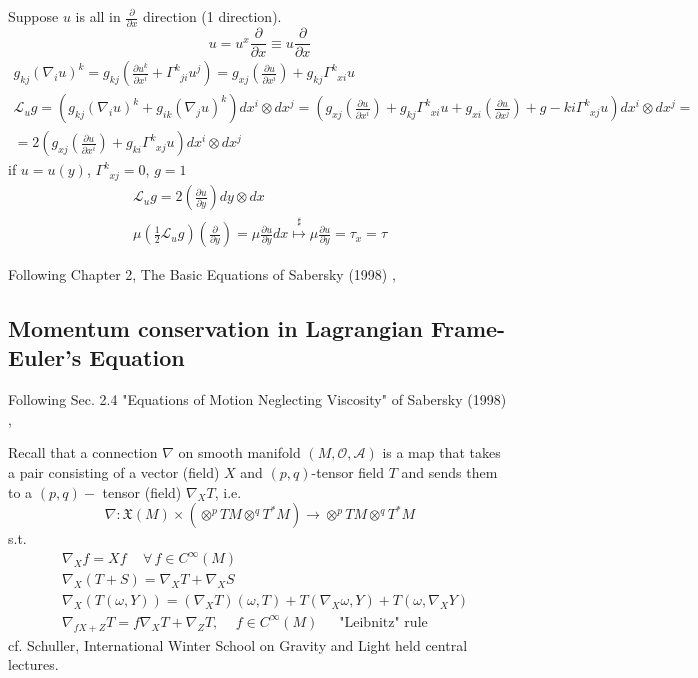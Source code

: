 \documentclass[twoside,landscape,10pt]{amsart}
\theoremstyle{plain}
\theoremstyle{definition}
\theoremstyle{remark}
\theoremstyle{remark}
\begin{document}
\begin{multicols*}{2}
Suppose $u$ is all in $\frac{ \partial }{ \partial x}$ direction (1 direction).  
\[
u = u^x \frac{ \partial }{ \partial x} \equiv u \frac{ \partial }{ \partial x}
\]
\[
\begin{gathered}
  g_{kj} (\nabla_i u)^k = g_{kj} \left( \frac{ \partial u^k}{ \partial x^i} + \Gamma^k_{ \; \; ji} u^j \right) = g_{xj} \left( \frac{ \partial u}{ \partial x^i} \right) + g_{kj} \Gamma^k_{ \; \; xi } u \\
  \mathcal{L}_u g = (g_{kj} (\nabla_i u)^k + g_{ik} (\nabla_j u)^k ) dx^i \otimes dx^j = (g_{xj} \left( \frac{ \partial u}{ \partial x^i} \right) + g_{kj} \Gamma^k_{ \; \; xi} u + g_{xi} \left( \frac{ \partial u }{ \partial x^j} \right) + g-{ki} \Gamma^k_{ \; \; xj} u ) dx^i \otimes dx^j = \\
  = 2 \left( g_{xj} \left( \frac{ \partial u}{ \partial x^i} \right)+ g_{ki} \Gamma^k_{ \; \; xj} u \right) dx^i \otimes dx^j
\end{gathered}
\]
if $u=u(y)$, $\Gamma^k_{ \; \; xj} = 0$, $g=1$
\[
\begin{gathered}
  \mathcal{L}_u g = 2 \left( \frac{ \partial u }{ \partial y} \right) dy \otimes dx \\ 
  \mu\left( \frac{1}{2} \mathcal{L}_u g \right) \left( \frac{ \partial }{ \partial y} \right) = \mu \frac{ \partial u}{ \partial y } dx \overset{\sharp}{\mapsto } \mu \frac{ \partial u}{ \partial y} = \tau_x = \tau
\end{gathered}
\]

Following Chapter 2, The Basic Equations of Sabersky (1998) \cite{SAHG1998},

\subsection{Momentum conservation in Lagrangian Frame-Euler's Equation}

Following Sec. 2.4 "Equations of Motion Neglecting Viscosity" of Sabersky (1998) \cite{SAHG1998},

Recall that a connection $\nabla$ on smooth manifold $(M, \mathcal{O}, \mathcal{A})$ is a map that takes a pair consisting of a vector (field) $X$ and $(p,q)$-tensor field $T$ and sends them to a $(p,q)-$ tensor (field) $\nabla_XT$, i.e. 
\[
\nabla : \mathfrak{X}(M) \times (\otimes^p TM \otimes^q T^*M) \to \otimes^p TM \otimes^q T^*M
\]
s.t. 
\[
\begin{aligned}
& \nabla_X f = Xf \quad \, \forall \, f \in C^{\infty}(M) \\ 
& \nabla_X(T + S) = \nabla_X T + \nabla_X S \\ 
& \nabla_X(T(\omega, Y)) = (\nabla_X T)(\omega, T) + T(\nabla_X \omega, Y) + T(\omega, \nabla_X Y) \\
& \nabla_{fX + Z} T = f\nabla_X T + \nabla_Z T , \quad \, f \in C^{\infty}(M) \quad \, \text{ "Leibnitz" rule }
\end{aligned}
\]
cf. Schuller, International Winter School on Gravity and Light held central lectures.


\end{multicols*}
\end{document}

